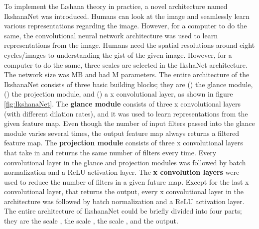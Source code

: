 \documentclass{article}
\begin{document}
To implement the Ikshana theory in practice, a novel architecture named IkshanaNet was introduced. Humans can look at the image and seamlessly learn various representations \cite{potter1975meaning} regarding the image. However, for a computer to do the same, the convolutional neural network architecture was used to learn representations from the image.
Humans need the spatial resolutions around eight cycles/images to understanding the gist of the given image\cite{oliva2000diagnostic}\cite{oliva2001modeling}. However, for a computer to do the same, three scales are selected in the IkshaNet architecture.
The network size was MB and had M parameters. The entire architecture of the IkshanaNet consists of three basic building blocks; they are () the glance module, () the projection module, and () a x convolutional layer, as shown in figure \ref{fig:IkshanaNet}. \newline
The \textbf{glance module} consists of three x convolutional layers (with different dilation rates), and it was used to learn representations from the given feature map. Even though the number of input filters passed into the glance module varies several times, the output feature map always returns a  filtered feature map. The \textbf{projection module} consists of three x convolutional layers that take in and returns the same number of filters every time. Every convolutional layer in the glance and projection modules was followed by batch normalization and a ReLU activation layer. The \textbf{x convolution layers} were used to reduce the number of filters in a given future map. Except for the last x convolutional layer, that returns the output, every  x convolutional layer in the architecture was followed by batch normalization and a ReLU activation layer. \newline 
The entire architecture of IkshanaNet could be briefly divided into four parts; they are the scale , the scale , the scale , and the output.\newline
\end{document}
